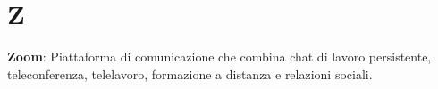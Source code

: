 \section{Z}
\textbf{Zoom}: Piattaforma di comunicazione che combina chat di lavoro persistente, teleconferenza, telelavoro, formazione a distanza e relazioni sociali.\\

